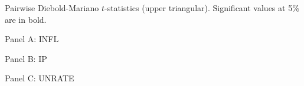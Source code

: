 \documentclass[12pt]{article}
\newcommand{\resultsdate}{2026-02-05}
\begin{document}
\begin{table}[htbp]
  \centering
  \caption{Pairwise Diebold-Mariano $t$-statistics (upper triangular). Significant values at 5\% are in bold.}
  \label{tab: dm mean}

  \begin{subtable}{\textwidth}
    \centering
    \caption*{Panel A: INFL}
    \resizebox{\textwidth}{!}{
    
    }
  \end{subtable}

  \vspace{0.75em}

  \begin{subtable}{\textwidth}
    \centering
    \caption*{Panel B: IP}
    \resizebox{\textwidth}{!}{
    
    }
  \end{subtable}

  \vspace{0.75em}

  \begin{subtable}{\textwidth}
    \centering
    \caption*{Panel C: UNRATE}
    \resizebox{\textwidth}{!}{
    
    }
  \end{subtable}
\end{table}
\end{document}
